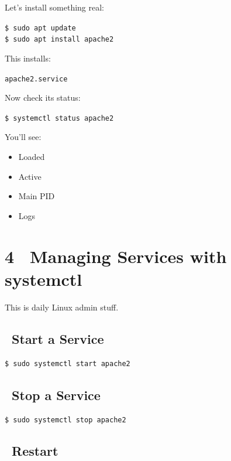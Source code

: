 \documentclass[12pt]{article}
\newcommand{\controlicon}{\faSlidersH}
\begin{document}
Let's install something real:

\begin{highlightbox}
\texttt{\$ sudo apt update}\\
\texttt{\$ sudo apt install apache2}
\end{highlightbox}

This installs:

\begin{highlightbox}
\texttt{apache2.service}
\end{highlightbox}

Now check its status:

\begin{highlightbox}
\texttt{\$ systemctl status apache2}
\end{highlightbox}

You'll see:

\begin{itemize}
    \item Loaded
    \item Active
    \item Main PID
    \item Logs
\end{itemize}

\section*{4 \controlicon\ Managing Services with systemctl}

This is daily Linux admin stuff.

\subsection*{\faPlay\ Start a Service}

\begin{highlightbox}
\texttt{\$ sudo systemctl start apache2}
\end{highlightbox}

\subsection*{\faStop\ Stop a Service}

\begin{highlightbox}
\texttt{\$ sudo systemctl stop apache2}
\end{highlightbox}

\subsection*{\faRedo\ Restart}
\end{document}
